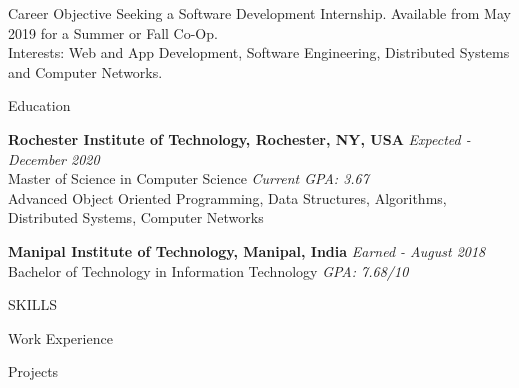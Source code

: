 \documentclass{resume} %
\begin{document}
\begin{rSection}{Career Objective}
 Seeking a Software Development Internship. Available from May 2019 for a Summer or Fall Co-Op.\\
 Interests: Web and App Development, Software Engineering, Distributed Systems and Computer Networks.
\end{rSection}

\begin{rSection}{Education}

{\bf Rochester Institute of Technology, Rochester, NY, USA} \hfill {\em Expected - December 2020} 
\\ Master of Science in Computer Science 
\hfill {\em Current GPA: 3.67} \\
Advanced Object Oriented Programming, Data Structures, Algorithms, Distributed Systems, Computer Networks

{\bf Manipal Institute of Technology, Manipal, India             } 
\hfill {\em Earned - August 2018} 
\\ Bachelor of Technology in Information Technology
\hfill {\em GPA: 7.68/10}
\end{rSection}



\begin{rSection}{SKILLS}



\end{rSection}



\begin{rSection}{Work Experience}

    
    
    
    
    
\end{rSection}

\begin{rSection}{Projects}
    
    \vspace{-2.15pt}

    

    
\end{rSection}
\end{document}

